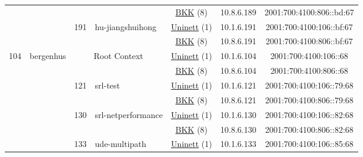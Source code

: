 \begin{small}
\begin{center}
\begin{longtable}{|c|c|c|c|c|c|c|c|}
  &  &  &  & \multicolumn{2}{|c|}{\tiny{\href{http://bkk.no}{BKK} (8)}} & \tiny{10.8.6.189} & \tiny{2001:700:4100:806::bd:67} \\* \cline{3-3}\cline{4-4}\cline{5-5}\cline{6-6}\cline{7-7}\cline{8-8}
  &  & \multirow{2}{*}{\tiny{191}} & \multicolumn{1}{|l|}{\multirow{2}{*}{\tiny{hu-jiangshuihong}}} & \multicolumn{2}{|c|}{\tiny{\href{https://www.uninett.no}{Uninett} (1)}} & \tiny{10.1.6.191} & \tiny{2001:700:4100:106::bf:67} \\* \cline{5-5}\cline{6-6}\cline{7-7}\cline{8-8}
  &  &  &  & \multicolumn{2}{|c|}{\tiny{\href{http://bkk.no}{BKK} (8)}} & \tiny{10.8.6.191} & \tiny{2001:700:4100:806::bf:67} \\ \hline
 \multirow{22}{*}{\tiny{104}} & \multicolumn{1}{|l|}{\multirow{22}{*}{\tiny{bergenhus}}} & \multicolumn{2}{|c|}{\multirow{2}{*}{\tiny{Root Context}}} & \multicolumn{2}{|c|}{\tiny{\href{https://www.uninett.no}{Uninett} (1)}} & \tiny{10.1.6.104} & \tiny{2001:700:4100:106::68} \\* \cline{5-5}\cline{6-6}\cline{7-7}\cline{8-8}
  &  & \multicolumn{2}{|c|}{} & \multicolumn{2}{|c|}{\tiny{\href{http://bkk.no}{BKK} (8)}} & \tiny{10.8.6.104} & \tiny{2001:700:4100:806::68} \\* \cline{3-3}\cline{4-4}\cline{5-5}\cline{6-6}\cline{7-7}\cline{8-8}
  &  & \multirow{2}{*}{\tiny{121}} & \multicolumn{1}{|l|}{\multirow{2}{*}{\tiny{srl-test}}} & \multicolumn{2}{|c|}{\tiny{\href{https://www.uninett.no}{Uninett} (1)}} & \tiny{10.1.6.121} & \tiny{2001:700:4100:106::79:68} \\* \cline{5-5}\cline{6-6}\cline{7-7}\cline{8-8}
  &  &  &  & \multicolumn{2}{|c|}{\tiny{\href{http://bkk.no}{BKK} (8)}} & \tiny{10.8.6.121} & \tiny{2001:700:4100:806::79:68} \\* \cline{3-3}\cline{4-4}\cline{5-5}\cline{6-6}\cline{7-7}\cline{8-8}
  &  & \multirow{2}{*}{\tiny{130}} & \multicolumn{1}{|l|}{\multirow{2}{*}{\tiny{srl-netperformance}}} & \multicolumn{2}{|c|}{\tiny{\href{https://www.uninett.no}{Uninett} (1)}} & \tiny{10.1.6.130} & \tiny{2001:700:4100:106::82:68} \\* \cline{5-5}\cline{6-6}\cline{7-7}\cline{8-8}
  &  &  &  & \multicolumn{2}{|c|}{\tiny{\href{http://bkk.no}{BKK} (8)}} & \tiny{10.8.6.130} & \tiny{2001:700:4100:806::82:68} \\* \cline{3-3}\cline{4-4}\cline{5-5}\cline{6-6}\cline{7-7}\cline{8-8}
  &  & \multirow{2}{*}{\tiny{133}} & \multicolumn{1}{|l|}{\multirow{2}{*}{\tiny{ude-multipath}}} & \multicolumn{2}{|c|}{\tiny{\href{https://www.uninett.no}{Uninett} (1)}} & \tiny{10.1.6.133} & \tiny{2001:700:4100:106::85:68} \\* \cline{5-5}\cline{6-6}\cline{7-7}\cline{8-8}

\end{longtable}
\end{center}
\end{small}
